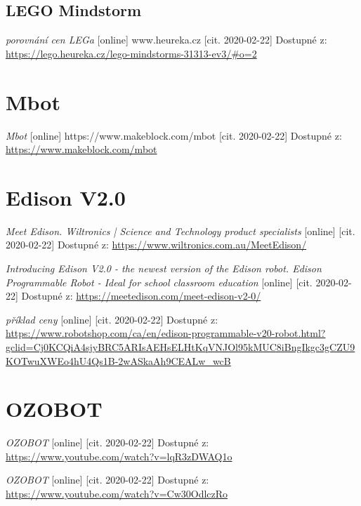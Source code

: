 \documentclass{template/socthesis}
\begin{document}
\listoftables
{}
\renewcommand{\refname}{Další zdroje}
\begin{thebibliography}{1}
	
	\subsection*{LEGO Mindstorm}
	
	\textit{porovnání cen LEGa} [online] www.heureka.cz [cit. 2020-02-22] Dostupné z: \\ 
	\url{https://lego.heureka.cz/lego-mindstorms-31313-ev3/#o=2}
	
	
	\section{Mbot}
	\textit{Mbot} [online] https://www.makeblock.com/mbot [cit. 2020-02-22] Dostupné z: \url{https://www.makeblock.com/mbot}
	
	
	\section{Edison V2.0}
	\textit{Meet Edison. Wiltronics | Science and Technology product specialists} [online] [cit. 2020-02-22] Dostupné z: \url{https://www.wiltronics.com.au/MeetEdison/}
	
	\textit{Introducing Edison V2.0 - the newest version of the Edison robot. Edison Programmable Robot - Ideal for school classroom education} [online] [cit. 2020-02-22] Dostupné z:
	\url{https://meetedison.com/meet-edison-v2-0/}
	 
	\textit{příklad ceny} [online] [cit. 2020-02-22] Dostupné z: \\ 
	\url{https://www.robotshop.com/ca/en/edison-programmable-v20-robot.html?gclid=Cj0KCQiA4sjyBRC5ARIsAEHsELHtKqVNJOl95kMUC8iBngIkgc3gCZU9KOTwuXWEo4hU4Qs1B-2wASkaAh9CEALw_wcB}
	
	\section{OZOBOT}
	
	\textit{OZOBOT} [online] [cit. 2020-02-22] Dostupné z:
	\url{https://www.youtube.com/watch?v=lqR3zDWAQ1o}
	
	\textit{OZOBOT} [online] [cit. 2020-02-22] Dostupné z:
	\url{https://www.youtube.com/watch?v=Cw30OdlczRo}
	

\end{thebibliography}
\end{document}
